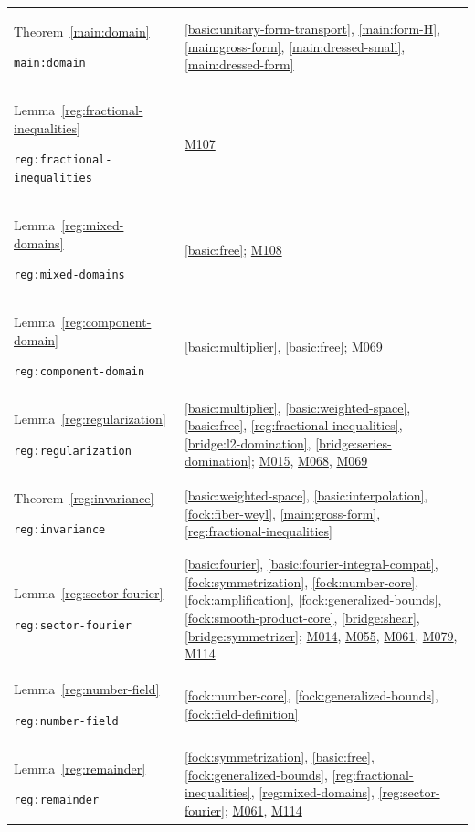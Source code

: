 \documentclass[11pt,a4paper]{article}
\theoremstyle{definition}
\theoremstyle{remark}
\begin{document}
\begin{longtable}{@{}p{}p{}@{}}
Theorem~\ref{main:domain}\par\nolinkurl{main:domain} & \ref{basic:unitary-form-transport}, \ref{main:form-H}, \ref{main:gross-form}, \ref{main:dressed-small}, \ref{main:dressed-form} \\[4pt]
Lemma~\ref{reg:fractional-inequalities}\par\nolinkurl{reg:fractional-inequalities} & \hyperref[base:M107]{M107} \\[4pt]
Lemma~\ref{reg:mixed-domains}\par\nolinkurl{reg:mixed-domains} & \ref{basic:free}; \hyperref[base:M108]{M108} \\[4pt]
Lemma~\ref{reg:component-domain}\par\nolinkurl{reg:component-domain} & \ref{basic:multiplier}, \ref{basic:free}; \hyperref[base:M069]{M069} \\[4pt]
Lemma~\ref{reg:regularization}\par\nolinkurl{reg:regularization} & \ref{basic:multiplier}, \ref{basic:weighted-space}, \ref{basic:free}, \ref{reg:fractional-inequalities}, \ref{bridge:l2-domination}, \ref{bridge:series-domination}; \hyperref[base:M015]{M015}, \hyperref[base:M068]{M068}, \hyperref[base:M069]{M069} \\[4pt]
Theorem~\ref{reg:invariance}\par\nolinkurl{reg:invariance} & \ref{basic:weighted-space}, \ref{basic:interpolation}, \ref{fock:fiber-weyl}, \ref{main:gross-form}, \ref{reg:fractional-inequalities} \\[4pt]
Lemma~\ref{reg:sector-fourier}\par\nolinkurl{reg:sector-fourier} & \ref{basic:fourier}, \ref{basic:fourier-integral-compat}, \ref{fock:symmetrization}, \ref{fock:number-core}, \ref{fock:amplification}, \ref{fock:generalized-bounds}, \ref{fock:smooth-product-core}, \ref{bridge:shear}, \ref{bridge:symmetrizer}; \hyperref[base:M014]{M014}, \hyperref[base:M055]{M055}, \hyperref[base:M061]{M061}, \hyperref[base:M079]{M079}, \hyperref[base:M114]{M114} \\[4pt]
Lemma~\ref{reg:number-field}\par\nolinkurl{reg:number-field} & \ref{fock:number-core}, \ref{fock:generalized-bounds}, \ref{fock:field-definition} \\[4pt]
Lemma~\ref{reg:remainder}\par\nolinkurl{reg:remainder} & \ref{fock:symmetrization}, \ref{basic:free}, \ref{fock:generalized-bounds}, \ref{reg:fractional-inequalities}, \ref{reg:mixed-domains}, \ref{reg:sector-fourier}; \hyperref[base:M061]{M061}, \hyperref[base:M114]{M114} \\[4pt]

\end{longtable}
\end{document}
